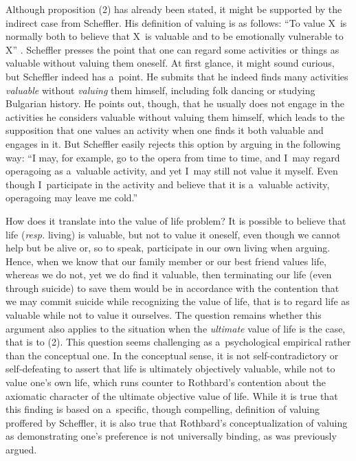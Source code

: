 Although proposition (2) has already been stated, it might be supported by the indirect case from Scheffler. His definition of valuing is as follows: ``To value X~is normally both to believe that X~is valuable and to be emotionally vulnerable to X'' 
\parencite[][p.31]{}. %
 Scheffler 
\parencite*[][pp.26–27]{} %
 presses the point that one can regard some activities or things as valuable without valuing them oneself. At first glance, it might sound curious, but Scheffler indeed has a~point. He submits that he indeed finds many activities \textit{valuable} without \textit{valuing} them himself, including folk dancing or studying Bulgarian history. He points out, though, that he usually does not engage in the activities he considers valuable without valuing them himself, which leads to the supposition that one values an activity when one finds it both valuable and engages in it. But Scheffler 
\parencite*[][p.27]{} %
 easily rejects this option by arguing in the following way: ``I may, for example, go to the opera from time to time, and I~may regard operagoing as a~valuable activity, and yet I~may still not value it myself. Even though I~participate in the activity and believe that it is a~valuable activity, operagoing may leave me cold.''



How does it translate into the value of life problem? It is possible to believe that life (\textit{resp.} living) is valuable, but not to value it oneself, even though we cannot help but be alive or, so to speak, participate in our own living when arguing. Hence, when we know that our family member or our best friend values life, whereas we do not, yet we do find it valuable, then terminating our life (even through suicide) to save them would be in accordance with the contention that we may commit suicide while recognizing the value of life, that is to regard life as valuable while not to value it ourselves. The question remains whether this argument also applies to the situation when the \textit{ultimate} value of life is the case, that is to (2). This question seems challenging as a~psychological empirical rather than the conceptual one. In the conceptual sense, it is not self-contradictory or self-defeating to assert that life is ultimately objectively valuable, while not to value one's own life, which runs counter to Rothbard's contention about the axiomatic character of the ultimate objective value of life. While it is true that this finding is based on a~specific, though compelling, definition of valuing proffered by Scheffler, it is also true that Rothbard's conceptualization of valuing as demonstrating one's preference is not universally binding, as was previously argued.



